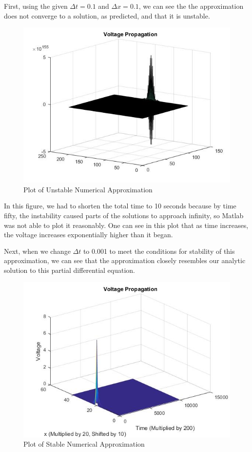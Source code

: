 \documentclass[12pt]{article}
\begin{document}
First, using the given $\Delta{t}=0.1$ and $\Delta{x}=0.1$, we can see the the approximation does not converge to a solution, as predicted, and that it is unstable. 
\begin{figure}[H]
  \includegraphics[width=\linewidth]{plot1.jpg}
  \caption{Plot of Unstable Numerical Approximation}
  \label{fig:sketch1}
\end{figure}
In this figure, we had to shorten the total time to 10 seconds because by time fifty, the instability caused parts of the solutions to approach infinity, so Matlab was not able to plot it reasonably. One can see in this plot that as time increases, the voltage increases exponentially higher than it began. \par
Next, when we change $\Delta{t}$ to 0.001 to meet the conditions for stability of this approximation, we can see that the approximation closely resembles our analytic solution to this partial differential equation.
\begin{figure}[H]
  \includegraphics[width=\linewidth]{Plot2.jpg}
  \caption{Plot of Stable Numerical Approximation}
  \label{fig:sketch2}
\end{figure}
\end{document}

